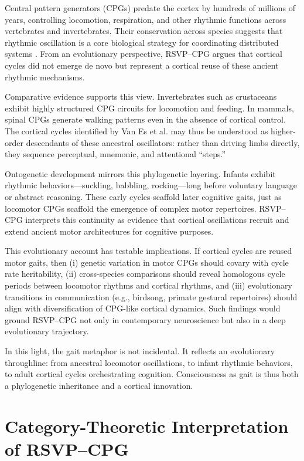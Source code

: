 \documentclass{article}
\begin{document}
Central pattern generators (CPGs) predate the cortex by hundreds of millions of years, controlling locomotion, respiration, and other rhythmic functions across vertebrates and invertebrates. Their conservation across species suggests that rhythmic oscillation is a core biological strategy for coordinating distributed systems \citep{grillner2006biological}. From an evolutionary perspective, RSVP--CPG argues that cortical cycles did not emerge de novo but represent a cortical reuse of these ancient rhythmic mechanisms.

Comparative evidence supports this view. Invertebrates such as crustaceans exhibit highly structured CPG circuits for locomotion and feeding. In mammals, spinal CPGs generate walking patterns even in the absence of cortical control. The cortical cycles identified by Van Es et al. \citep{van2025cortical} may thus be understood as higher-order descendants of these ancestral oscillators: rather than driving limbs directly, they sequence perceptual, mnemonic, and attentional “steps.”

Ontogenetic development mirrors this phylogenetic layering. Infants exhibit rhythmic behaviors—suckling, babbling, rocking—long before voluntary language or abstract reasoning. These early cycles scaffold later cognitive gaits, just as locomotor CPGs scaffold the emergence of complex motor repertoires. RSVP--CPG interprets this continuity as evidence that cortical oscillations recruit and extend ancient motor architectures for cognitive purposes.

This evolutionary account has testable implications. If cortical cycles are reused motor gaits, then (i) genetic variation in motor CPGs should covary with cycle rate heritability, (ii) cross-species comparisons should reveal homologous cycle periods between locomotor rhythms and cortical rhythms, and (iii) evolutionary transitions in communication (e.g., birdsong, primate gestural repertoires) should align with diversification of CPG-like cortical dynamics. Such findings would ground RSVP--CPG not only in contemporary neuroscience but also in a deep evolutionary trajectory.

In this light, the gait metaphor is not incidental. It reflects an evolutionary throughline: from ancestral locomotor oscillations, to infant rhythmic behaviors, to adult cortical cycles orchestrating cognition. Consciousness as gait is thus both a phylogenetic inheritance and a cortical innovation.

\section{Category-Theoretic Interpretation of RSVP--CPG}
\end{document}
